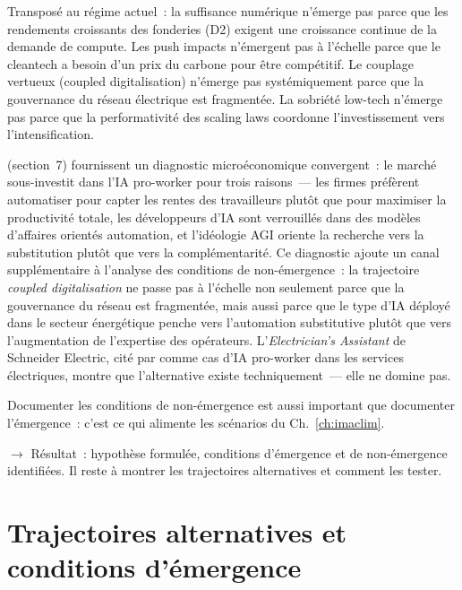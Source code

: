 {Transpos\'e au r\'egime actuel~: la suffisance num\'erique n'\'emerge pas parce que les rendements croissants des fonderies (D2) exigent une croissance continue de la demande de compute. Les push impacts n'\'emergent pas \`a l'\'echelle parce que le cleantech a besoin d'un prix du carbone pour \^etre comp\'etitif. Le couplage vertueux (coupled digitalisation) n'\'emerge pas syst\'emiquement parce que la gouvernance du r\'eseau \'electrique est fragment\'ee. La sobri\'et\'e low-tech n'\'emerge pas parce que la performativit\'e des scaling laws coordonne l'investissement vers l'intensification.

\textcite{acemoglu_building_2026} (section~7) fournissent un diagnostic micro\'economique convergent~: le march\'e sous-investit dans l'IA pro-worker pour trois raisons~--- les firmes pr\'ef\`erent automatiser pour capter les rentes des travailleurs plut\^ot que pour maximiser la productivit\'e totale, les d\'eveloppeurs d'IA sont verrouill\'es dans des mod\`eles d'affaires orient\'es automation, et l'id\'eologie AGI oriente la recherche vers la substitution plut\^ot que vers la compl\'ementarit\'e. Ce diagnostic ajoute un canal suppl\'ementaire \`a l'analyse des conditions de non-\'emergence~: la trajectoire \emph{coupled digitalisation} ne passe pas \`a l'\'echelle non seulement parce que la gouvernance du r\'eseau est fragment\'ee, mais aussi parce que le type d'IA d\'eploy\'e dans le secteur \'energ\'etique penche vers l'automation substitutive plut\^ot que vers l'augmentation de l'expertise des op\'erateurs. L'\emph{Electrician's Assistant} de Schneider Electric, cit\'e par \textcite{acemoglu_building_2026} comme cas d'IA pro-worker dans les services \'electriques, montre que l'alternative existe techniquement~--- elle ne domine pas.

Documenter les conditions de non-\'emergence est aussi important que documenter l'\'emergence~: c'est ce qui alimente les sc\'enarios du Ch.~\ref{ch:imaclim}.

$\to$ R\'esultat~: hypoth\`ese formul\'ee, conditions d'\'emergence et de non-\'emergence identifi\'ees. Il reste \`a montrer les trajectoires alternatives et comment les tester.}


\clearpage
\section{Trajectoires alternatives et conditions d'\'emergence}\label{sec:trajectoires}

